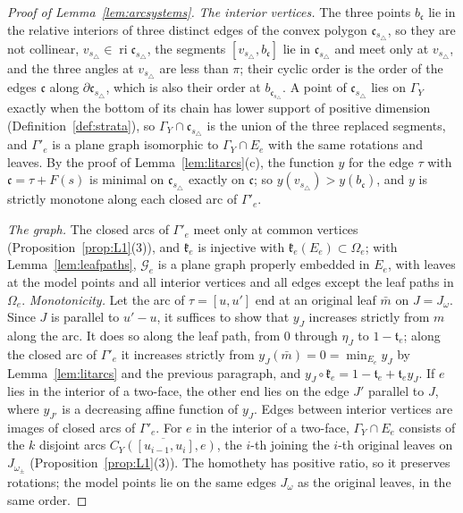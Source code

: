 \begin{proof}[Proof of Lemma~\ref{lem:arcsystems}]
\emph{The interior vertices.} The three points $b_{\mathfrak c}$ lie in the relative interiors of three distinct edges of
the convex polygon $\mathfrak c_{s_\triangle}$, so they are not collinear, $v_{s_\triangle}\in\operatorname{ri}\mathfrak c_{s_\triangle}$, the
segments $[v_{s_\triangle},b_{\mathfrak c}]$ lie in $\mathfrak c_{s_\triangle}$ and meet only at $v_{s_\triangle}$, and the three angles at
$v_{s_\triangle}$ are less than $\pi$; their cyclic order is the order of the edges $\mathfrak c$ along $\partial\mathfrak
c_{s_\triangle}$, which is also their order at $b_{\mathfrak c_{s_\triangle}}$. A point of $\mathfrak c_{s_\triangle}$ lies on $\Gamma_Y$ exactly
when the bottom of its chain has lower support of positive dimension (Definition~\ref{def:strata}), so $\Gamma_Y\cap
\mathfrak c_{s_\triangle}$ is the union of the three replaced segments, and $\Gamma'_e$ is a plane graph isomorphic to
$\Gamma_Y\cap E_e$ with the same rotations and leaves. By the proof of Lemma~\ref{lem:litarcs}(c), the function $y$ for
the edge $\tau$ with $\mathfrak c=\tau+F(s)$ is minimal on $\mathfrak c_{s_\triangle}$ exactly on $\mathfrak c$; so $y(v_{s_\triangle})>
y(b_{\mathfrak c})$, and $y$ is strictly monotone along each closed arc of $\Gamma'_e$.

\emph{The graph.} The closed arcs of $\Gamma'_e$ meet only at common vertices (Proposition~\ref{prop:L1}(3)), and
$\mathfrak k_e$ is injective with $\mathfrak k_e(E_e)\subset\Omega_e$; with Lemma~\ref{lem:leafpaths}, $\mathscr G_e$ is a
plane graph properly embedded in $E_e$, with leaves at the model points and all interior vertices and all edges except
the leaf paths in $\Omega_e$. \emph{Monotonicity.} Let the arc of $\tau=[u,u']$ end at an original leaf $\bar m$ on
$J=J_\omega$. Since $J$ is parallel to $u'-u$, it suffices to show that $y_J$ increases strictly from $m$ along the arc.
It does so along the leaf path, from $0$ through $\eta_J$ to $1-\mathfrak t_e$; along the closed arc of $\Gamma'_e$ it
increases strictly from $y_J(\bar m)=0=\min_{E_e}y_J$ by Lemma~\ref{lem:litarcs} and the previous paragraph, and
$y_J\circ\mathfrak k_e=1-\mathfrak t_e+\mathfrak t_ey_J$. If $e$ lies in the interior of a two-face, the other end lies on the
edge $J'$ parallel to $J$, where $y_{J'}$ is a decreasing affine function of $y_J$. Edges between interior vertices are
images of closed arcs of $\Gamma'_e$. For $e$ in the interior of a two-face, $\Gamma_Y\cap E_e$ consists of the $k$
disjoint arcs $\overline{C_Y([u_{i-1},u_i],e)}$, the $i$-th joining the $i$-th original leaves on $J_{\omega_\pm}$
(Proposition~\ref{prop:L1}(3)). The homothety has positive ratio, so it preserves rotations; the model points lie on the
same edges $J_\omega$ as the original leaves, in the same order.
\end{proof}

